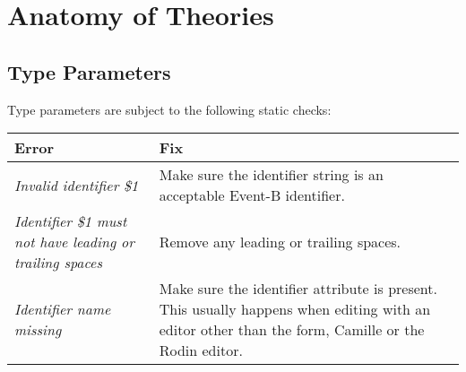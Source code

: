 \section{Anatomy of Theories} \label{anatomy}
\subsection{Type Parameters}
Type parameters are subject to the following static checks:
\begin{table}
	\begin{center}
		\begin{tabular}{|l|l|}
			\hline
			\textbf{Error} & \textbf{Fix}\\
			\hline
			\textit{Invalid identifier \$1} & Make sure the identifier string is an acceptable Event-B identifier.\\
			\hline
			\textit{Identifier \$1 must not have leading or trailing spaces} & Remove any leading or trailing spaces.\\
			\hline
			\textit{Identifier name missing} & Make sure the identifier attribute is present. This usually happens when editing with an editor other than the form, Camille or the Rodin editor.\\
			\hline
		\end{tabular}
	\end{center}
\end{table}

